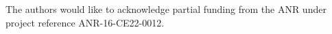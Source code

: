 \documentclass[twocolumn]{svjour3}          %
\begin{document}

\begin{acknowledgements}
The authors would like to acknowledge partial funding from the ANR under project reference ANR-16-CE22-0012.
\end{acknowledgements}

\end{document}
